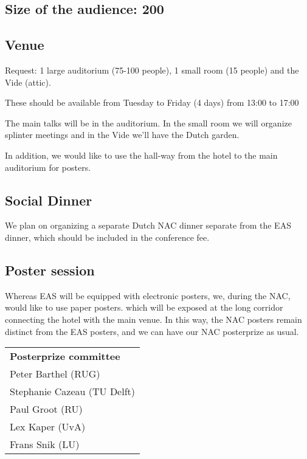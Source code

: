 \documentclass{article}
\begin{document}
\subsection{Size of the audience: 200}

\subsection{Venue}

Request: 1 large auditorium (75-100 people), 1 small room (15 people) and the Vide (attic).

These should be available from Tuesday to Friday (4 days) from 13:00 to 17:00

The main talks will be in the auditorium. In the small room we will
organize splinter meetings and in the Vide we'll have the Dutch
garden.

In addition, we would like to use the hall-way from the hotel to the
main auditorium for posters.

\subsection{Social Dinner}

We plan on organizing a separate Dutch NAC dinner separate from the
EAS dinner, which should be included in the conference fee.

\subsection{Poster session}

Whereas EAS will be equipped with electronic posters, we, during the
NAC, would like to use paper posters. which will be exposed at the
long corridor connecting the hotel with the main venue.  In this way,
the NAC posters remain distinct from the EAS posters, and we can have
our NAC posterprize as usual.

    \begin{tabular}{l}
        \textbf{Posterprize committee}\\
        Peter Barthel (RUG) \\         
        Stephanie Cazeau (TU Delft)  \\         
        Paul Groot (RU) \\
        Lex Kaper (UvA) \\
        Frans Snik (LU) \\
    \end{tabular}
\end{document}
